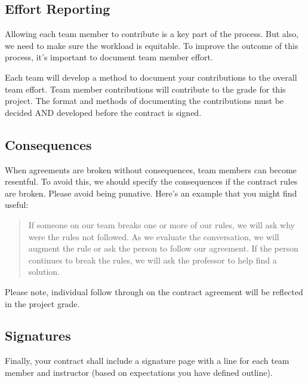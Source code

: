 \documentclass{article}\usepackage[]{graphicx}\usepackage[]{color}
\begin{document}
\subsection{Effort Reporting}

Allowing each team member to contribute is a key part of the process. But also, we need to make sure the workload is equitable. To improve the outcome of this process, it's important to document team member effort.

Each team will develop a method to document your contributions to the overall team effort. Team member contributions will contribute to the grade for this project. The format and methods of documenting the contributions must be decided AND developed before the contract is signed.

\subsection{Consequences}

When agreements are broken without consequences, team members can become resentful. To avoid this, we should specify the consequences if the contract rules are broken. Please avoid being punative. Here's an example that you might find useful:

\begin{quote}
If someone on our team breaks one or more of our rules, we will ask why were the rules not followed. As we evaluate the conversation, we will augment the rule or ask the person to follow our agreement. If the person continues to break the rules, we will ask the professor to help find a solution.
\end{quote}

\noindent Please note, individual follow through on the contract agreement will be reflected in the project grade.

\subsection{Signatures}

Finally, your contract shall include a signature page with a line for each team member and instructor (based on expectations you have defined outline).
\end{document}
